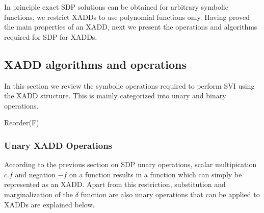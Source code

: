 \documentclass[twoside,11pt]{article}
\begin{document}
In principle exact SDP solutions can be obtained for arbitrary symbolic functions, we  restrict XADDs to use polynomial functions only. %
Having proved the main properties of an XADD, next we present the operations and algorithms required for SDP for XADDs.

\subsection{XADD algorithms and operations}

In this section we review the symbolic operations required to perform SVI using the XADD structure. This is mainly categorized into unary and binary operations.   

\begin{algorithm}[t!]

\BlankLine
{}
\caption{{\sc Reorder}(F)  \label{alg:reorder}}
\end{algorithm}
\subsubsection{Unary XADD Operations}
According to the previous section on SDP unary operations, scalar multipication $c.f$ and negation $- f$ on a function results in a function which can simply be represented as an XADD. Apart from this restriction, substitution and marginalization of the $\delta$ function are also unary operations that can be applied to XADDs are explained below.  
\end{document}
